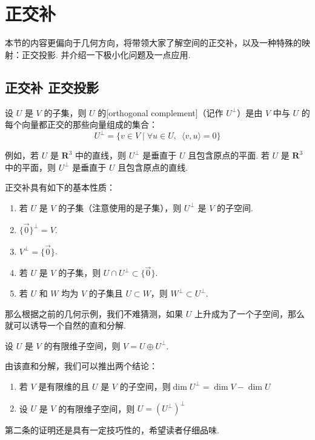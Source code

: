 \section{正交补}

本节的内容更偏向于几何方向，将带领大家了解空间的正交补，以及一种特殊的映射：正交投影. 并介绍一下极小化问题及一点应用.

\subsection{正交补 \quad 正交投影}

\begin{definition}
    设 $ U $ 是 $ V $ 的子集，则 $ U $ 的[orthogonal complement]（记作 $ U^{\perp } $）是由 $ V $ 中与 $ U $ 的每个向量都正交的那些向量组成的集合：
    \[U^{\perp } = \{ v \in V \mid \forall u \in U, \enspace \langle v, u\rangle = 0\}\]
\end{definition}

例如，若 $ U $ 是 $ \mathbf{R}^{3} $ 中的直线，则 $ U^{\perp } $ 是垂直于 $ U $ 且包含原点的平面. 若 $ U $ 是 $ \mathbf{R}^{3} $ 中的平面，则 $ U^{\perp } $ 是垂直于 $ U $ 且包含原点的直线.

正交补具有如下的基本性质：
\begin{enumerate}
    \item 若 $ U $ 是 $ V $ 的子集（注意使用的是子集），则 $ U^{\perp }$ 是 $ V $ 的子空间.

    \item $ \{ \vec{0} \}^{\perp } = V $.

    \item $ V^{\perp } = \{ \vec{0} \} $.

    \item 若 $ U $ 是 $ V $ 的子集，则 $ U \cap U^{\perp } \subset \{ \vec{0} \}$.

    \item 若 $ U $ 和 $ W $ 均为 $ V $ 的子集且 $ U \subset W $，则 $ W^{\perp } \subset U^{\perp }$.
\end{enumerate}

那么根据之前的几何示例，我们不难猜测，如果 $ U $ 上升成为了一个子空间，那么就可以诱导一个自然的直和分解.

\begin{theorem}
    设 $ U $ 是 $ V $ 的有限维子空间，则 $ V = U \oplus U^{\perp } $.
\end{theorem}

由该直和分解，我们可以推出两个结论：
\begin{enumerate}
    \item 若 $ V $ 是有限维的且 $ U $ 是 $ V $ 的子空间，则$ \dim U^{\perp }= \dim V - \dim U$

    \item 设 $ U $ 是 $ V $ 的有限维子空间，则 $ U = (U^{\perp})^{\perp} $
\end{enumerate}
第二条的证明还是具有一定技巧性的，希望读者仔细品味.

